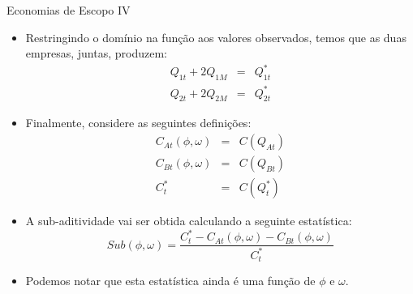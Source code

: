 \documentclass{beamer}
\begin{document}
\begin{frame}{Economias de Escopo IV}
\small
\begin{itemize}
\item Restringindo o domínio na função aos valores observados, temos que
as duas empresas, juntas, produzem:
\begin{eqnarray*}
Q_{1t}+2Q_{1M} & = & Q_{1t}^{*}\\
Q_{2t}+2Q_{2M} & = & Q_{2t}^{*}
\end{eqnarray*}
\item Finalmente, considere as seguintes definições:
\begin{eqnarray*}
C_{At}(\phi,\omega) & = & C(Q_{At})\\
C_{Bt}(\phi,\omega) & = & C(Q_{Bt})\\
C_{t}^{*} & = & C(Q_{t}^{*})
\end{eqnarray*}
\item A sub-aditividade vai ser obtida calculando a seguinte estatística:
\[
Sub(\phi,\omega)=\frac{C_{t}^{*}-C_{At}(\phi,\omega)-C_{Bt}(\phi,\omega)}{C_{t}^{*}}
\]
\item Podemos notar que esta estatística ainda é uma função de $\phi$ e
$\omega$. 
\end{itemize}

\end{frame}


%
%


\end{document}
